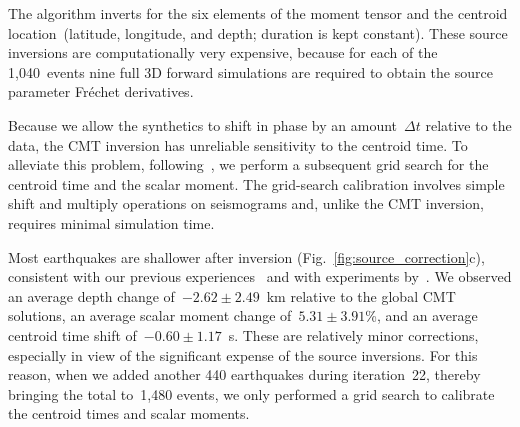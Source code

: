 \documentclass[extra,mreferee]{gji}
\begin{document}
The algorithm inverts for the six elements of the moment tensor
and the centroid location~(latitude, longitude, and depth; duration is kept constant).
These source inversions are computationally very expensive,
because for each of the 1,040~events nine full 3D forward simulations are required to obtain the source parameter Fr\'echet derivatives.

Because we allow the synthetics to shift in phase by an amount~$\Delta t$ relative to the data,
the CMT inversion has unreliable sensitivity to the centroid time.
To alleviate this problem,
following~\cite{zhu2012structure},
we perform a subsequent grid search for the centroid time and the scalar moment.
The grid-search calibration involves simple shift and multiply operations on seismograms
and, unlike the CMT inversion, requires minimal simulation time.

Most earthquakes are shallower after inversion
(Fig.~\ref{fig:source_correction}c),
consistent with our previous experiences~\citep[e.g.,][]{zhu2015seismic,chen2015multiparameter,bozdaug2016global} and with experiments by~\cite{hjorleifsdottir2010effects}.
We observed an average depth change of~$-2.62\pm2.49$~km relative to the global CMT solutions,
an average scalar moment change of~$5.31\pm3.91$\%,
and an average centroid time shift of~$-0.60\pm1.17$~s.
These are relatively minor corrections, especially in view of the significant expense of the source inversions.
For this reason, when we added another 440 earthquakes during iteration~22,
thereby bringing the total to~1,480 events,
we only performed a grid search to calibrate the centroid times and scalar moments.


\end{document}
